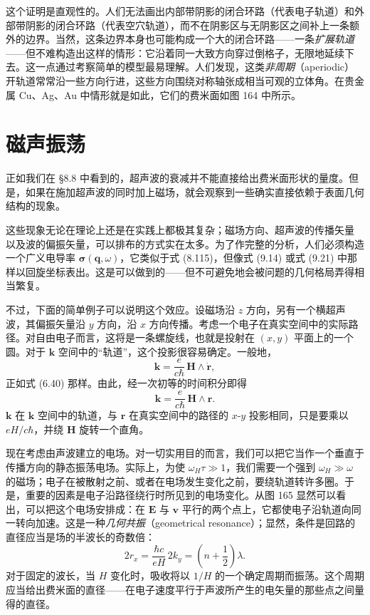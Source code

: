 
这个证明是直观性的。人们无法画出内部带阴影的闭合环路（代表电子轨道）和外部带阴影的闭合环路（代表空穴轨道），而不在阴影区与无阴影区之间补上一条额外的边界。当然，这条边界本身也可能构成一个大的闭合环路——一条\emph{扩展轨道}——但不难构造出这样的情形：它沿着同一大致方向穿过倒格子，无限地延续下去。这一点通过考察简单的模型最易理解。人们发现，这类\emph{非周期}（aperiodic）开轨道常常沿一些方向行进，这些方向围绕对称轴张成相当可观的立体角。在贵金属 Cu、Ag、Au 中情形就是如此，它们的费米面如图 164 中所示。

\section{磁声振荡}

正如我们在 §8.8 中看到的，超声波的衰减并不能直接给出费米面形状的量度。但是，如果在施加超声波的同时加上磁场，就会观察到一些确实直接依赖于表面几何结构的现象。

这些现象无论在理论上还是在实践上都极其复杂；磁场方向、超声波的传播矢量
以及波的偏振矢量，可以排布的方式实在太多。为了作完整的分析，人们必须构造一个广义电导率 $\boldsymbol{\sigma}(\mathbf{q},\omega)$，它类似于式 (8.115)，但像式 (9.14) 或式 (9.21) 中那样以回旋坐标表出。这是可以做到的——但不可避免地会被问题的几何格局弄得相当繁复。

不过，下面的简单例子可以说明这个效应。设磁场沿 $z$ 方向，另有一个横超声波，其偏振矢量沿 $y$ 方向，沿 $x$ 方向传播。考虑一个电子在真实空间中的实际路径。对自由电子而言，这将是一条螺旋线，也就是投射在 $(x,y)$ 平面上的一个圆。对于 $\mathbf{k}$ 空间中的“轨道”，这个投影很容易确定。一般地，
\begin{equation*}
\mathbf{k}=\frac{e}{c\hbar}\,\mathbf{H}\wedge\dot{\mathbf{r}}, \tag{9.45}
\end{equation*}
正如式 (6.40) 那样。由此，经一次初等的时间积分即得
\begin{equation*}
\mathbf{k}=\frac{e}{c\hbar}\,\mathbf{H}\wedge\mathbf{r}. \tag{9.46}
\end{equation*}
$\mathbf{k}$ 在 $\mathbf{k}$ 空间中的轨道，与 $\mathbf{r}$ 在真实空间中的路径的 $x$-$y$ 投影相同，只是要乘以 $eH/c\hbar$，并绕 $\mathbf{H}$ 旋转一个直角。


现在考虑由声波建立的电场。对一切实用目的而言，我们可以把它当作一个垂直于传播方向的静态振荡电场。实际上，为使 $\omega_H\tau\gg 1$，我们需要一个强到 $\omega_H\gg\omega$ 的磁场；电子在被散射之前、或者在电场发生变化之前，要绕轨道转许多圈。于是，重要的因素是电子沿路径绕行时所见到的电场变化。从图 165 显然可以看出，可以把这个电场安排成：在 $\mathbf{E}$ 与 $\mathbf{v}$ 平行的两个点上，它都使电子沿轨道向同一转向加速。这是一种\emph{几何共振}（geometrical resonance）；显然，条件是回路的直径应当是场的半波长的奇数倍：
\begin{equation*}
2r_{x}=\frac{\hbar c}{eH}\,2k_{y}=\left(n+\frac{1}{2}\right)\lambda. \tag{9.47}
\end{equation*}
对于固定的波长，当 $H$ 变化时，吸收将以 $1/H$ 的一个确定周期而振荡。这个周期应当给出费米面的直径——在电子速度平行于声波所产生的电矢量的那些点之间量得的直径。

